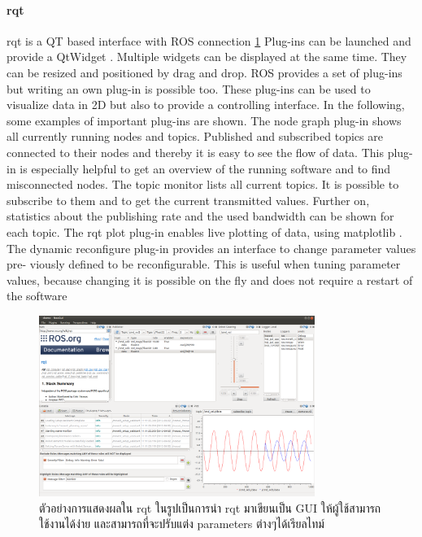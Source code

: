 \paragraph*{rqt}
rqt  is  a  QT  based  interface  with  ROS  connection \ref{fig:ros_gui_example}   Plug-ins  can  be
launched and provide a
QtWidget
.  Multiple widgets can be displayed at the same
time.  They can be resized and positioned by drag and drop.  ROS provides a set
of plug-ins but writing an own plug-in is possible too.  These plug-ins can be used
to visualize data in 2D but also to provide a controlling interface.  In the following,
some examples of important plug-ins are shown.
The
node
graph
plug-in shows all currently running nodes and topics.  Published
and subscribed topics are connected to their nodes and thereby it is easy to see the
flow of data.  This plug-in is especially helpful to get an overview of the running
software and to find misconnected nodes.
The
topic
monitor
lists all current topics.  It is possible to subscribe to them and
to get the current transmitted values.  Further on, statistics about the publishing
rate and the used bandwidth can be shown for each topic.
The
rqt
plot
plug-in  enables  live  plotting  of  data,  using
matplotlib
.    The
dynamic
reconfigure
plug-in provides an interface to change parameter values pre-
viously defined to be reconfigurable.  This is useful when tuning parameter values,
because  changing  it  is  possible  on  the  fly  and  does  not  require  a  restart  of  the
software


\begin{figure}[htbp]
    \centering
    \includegraphics[width=0.8\textwidth]{chapter2/images/ros_gui_example.png}
	\caption{ตัวอย่างการแสดงผลใน rqt ในรูปเป็นการนำ rqt มาเขียนเป็น GUI ให้ผู้ใช้สามารถใช้งานได้ง่าย
	และสามารถที่จะปรับแต่ง parameters ต่างๆได้เรียลไทม์}
    \label{fig:ros_gui_example}
\end{figure}

